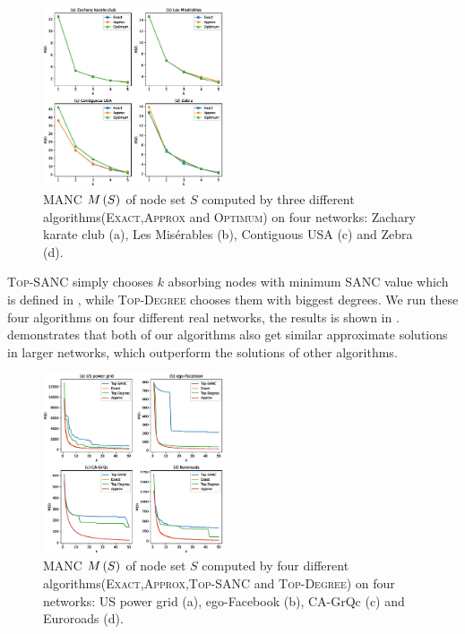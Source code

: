 \documentclass[sigconf]{acmart}
\begin{document}
\begin{figure}
    \centering
    \includegraphics[width=0.475\textwidth]{compare_effects_optimum.eps}
    \caption{MANC \(M\left(S\right)\) of node set \(S\) computed by three different algorithms(\textsc{Exact},\textsc{Approx} and \textsc{Optimum}) on four networks: Zachary karate club (a), Les Misérables (b), Contiguous USA (c) and Zebra (d).\label{pic:compare-effect-optimum}}
\end{figure}

\textsc{Top-SANC} simply chooses \(k\) absorbing nodes with minimum SANC value which is defined in , while \textsc{Top-Degree} chooses them with biggest degrees.
We run these four algorithms on four different real networks, the results is shown in .
 demonstrates that both of our algorithms also get similar approximate solutions in larger networks, which outperform the solutions of other algorithms.

\begin{figure}
    \centering
    \includegraphics[width=0.475\textwidth]{compare_effects_exact.eps}
    \caption{MANC \(M\left(S\right)\) of node set \(S\) computed by four different algorithms(\textsc{Exact},\textsc{Approx},\textsc{Top-SANC} and \textsc{Top-Degree}) on four networks: US power grid (a), ego-Facebook (b), CA-GrQc (c) and Euroroads (d).\label{pic:compare-effect}}
\end{figure}
\end{document}
